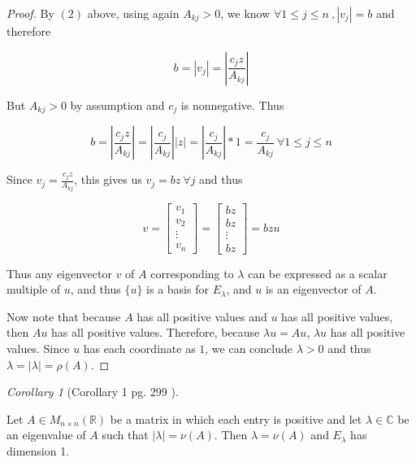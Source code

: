 \documentclass{amsart}
\theoremstyle{definition}
\theoremstyle{remark}
\newtheorem{corollary}{Corollary}[theorem]
\numberwithin{equation}{section}
\begin{document}
\begin{proof}
By $(2)$ above, using again $A_{kj} > 0$, we know $\forall  1 \leq j
\leq n\ , |v_j| = b$ and therefore

$$b = |v_j| = |\frac{c_jz}{A_{kj}}|$$

But $A_{kj} > 0$ by assumption and $c_j$ is nonnegative.
Thus

$$ b = |\frac{c_jz}{A_{kj}}| = |\frac{c_j}{A_{kj}}||z| = |\frac{c_j}{A_{kj}}|*1 = \frac{c_j}{A_{kj}} \ \forall 1 \leq j \leq n$$

Since $v_j = \frac{c_jz}{A_{kj}}$, this gives us $v_j = bz\ \forall j$ and thus


\begin{equation}
    v = \begin{bmatrix}
           v_{1} \\
           v_{2} \\
           \vdots \\
           v_{n}
         \end{bmatrix}
        = \begin{bmatrix}
           bz \\
           bz \\
           \vdots \\
           bz
         \end{bmatrix}
        = bzu
\end{equation}

Thus any eigenvector $v$ of $A$ corresponding to $\lambda$ can be
expressed as a scalar multiple of $u$, and thus $\{ u \}$ is a basis
for $E_{\lambda}$, and $u$ is an eigenvector of $A$.


Now note that because $A$ has all positive values and $u$ has all positive values, then $Au$ has all positive values.
Therefore, because  $\lambda u = Au$, $\lambda u$ has all positive values.
Since $u$ has each coordinate as $1$, we can conclude $\lambda > 0$ and thus $\lambda = |\lambda| = \rho(A)$.


\end{proof}

\begin{corollary}[Corollary 1 pg. 299 \cite{friedberg2003linear} ]\label{cor5181}

    Let $A \in M_{n \times n}(\mathbb{R})$ be a matrix in which each entry is positive and let $\lambda \in \mathbb{C}$ be an eigenvalue of $A$ such that $|\lambda| = \nu(A)$.
    Then  $\lambda = \nu(A)$ and $E_{\lambda}$ has dimension 1. \newline

\end{corollary}
\end{document}
